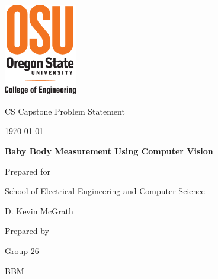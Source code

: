 \documentclass[onecolumn, draftclsnofoot,10pt, compsoc]{IEEEtran}
\def \CapstoneTeamName{		    BBM}
\def \CapstoneTeamNumber{		26}
\def \CapstoneProjectName{		Baby Body Measurement Using Computer Vision}
\def \CapstoneSponsorCompany{	School of Electrical Engineering and Computer Science}
\def \CapstoneSponsorPerson{	D. Kevin McGrath}
\def \DocType{		Problem Statement
				}
\newcommand{\NameSigPair}[1]{\par
\makebox[2.75in][r]{#1} \hfil 	\makebox[3.25in]{\makebox[2.25in]{\hrulefill} \hfill		\makebox[.75in]{\hrulefill}}
\par\vspace{-12pt} \textit{\tiny\noindent
\makebox[2.75in]{} \hfil		\makebox[3.25in]{\makebox[2.25in][r]{Signature} \hfill	\makebox[.75in][r]{Date}}}}
\renewcommand{\NameSigPair}[1]{#1}
\begin{document}
\begin{titlepage}
    \begin{singlespace}
    	\includegraphics[height=4cm]{coe_v_spot1}
        \hfill 
        \par\vspace{.2in}
        \centering
        \scshape{
            \huge CS Capstone \DocType \par
            {\large\today}\par
            \vspace{.5in}
            \textbf{\Huge\CapstoneProjectName}\par
            \vfill
            {\large Prepared for}\par
            \Huge \CapstoneSponsorCompany\par
            \vspace{5pt}
            {\Large\NameSigPair{\CapstoneSponsorPerson}\par}
            {\large Prepared by }\par
            Group\CapstoneTeamNumber\par
            \CapstoneTeamName\par 
            \vspace{5pt}
            {\Large
                \NameSigPair{\GroupMemberOne}\par
            }
            \vspace{20pt}
        }
        \begin{abstract}
        	

\end{abstract}
\end{singlespace}
\end{titlepage}
\end{document}
